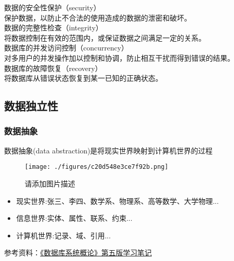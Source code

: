 \begin{enumerate}
\begin{itemize}
数据的安全性保护（security）\\
保护数据，以防止不合法的使用造成的数据的泄密和破坏。\\

数据的完整性检查（integrity）\\
将数据控制在有效的范围内，或保证数据之间满足一定的关系。\\

数据库的并发访问控制（concurrency）\\
对多用户的并发操作加以控制和协调，防止相互干扰而得到错误的结果。\\

数据库的故障恢复（recovery）\\
将数据库从错误状态恢复到某一已知的正确状态。\\

\end{itemize}
\end{enumerate}

\subsection{数据独立性}
\subsubsection{数据抽象} 
数据抽象(data abstraction)是将现实世界映射到计算机世界的过程
\begin{figure}[ht]
\centering
\texttt{[image: ./figures/c20d548e3ce7f92b.png]}
\caption{请添加图片描述} \label{fig_DBS001_1}
\end{figure}
\begin{itemize}
\item 现实世界:张三、李四、数学系、物理系、高等数学、大学物理...\\
\item 信息世界:实体、属性、联系、约束...\\
\item 计算机世界:记录、域、引用...\\
\end{itemize}
参考资料：\href{http://t.csdn.cn/SFcuR}{《数据库系统概论》第五版学习笔记}